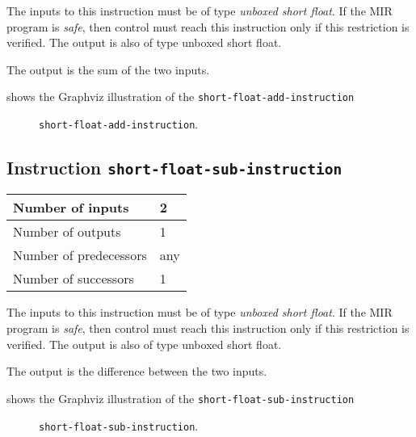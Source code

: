 The inputs to this instruction must be of type \emph{unboxed short
  float}.  If the MIR program is \emph{safe}, then control must reach
this instruction only if this restriction is verified.  The output is
also of type unboxed short float.

The output is the sum of the two inputs.

 shows the Graphviz illustration of the
\texttt{short-float-add-instruction}

\begin{figure}
\begin{center}
\end{center}
\caption{\label{fig-short-float-add-instruction}
\texttt{short-float-add-instruction}.}
\end{figure}

\subsection{Instruction \texttt{short-float-sub-instruction}}
\label{mir-instruction-short-float-sub}

\begin{tabular}{|l|l|}
\hline
Number of inputs & 2\\
\hline
Number of outputs & 1\\
\hline
Number of predecessors & any\\
\hline
Number of successors & 1\\
\hline
\end{tabular}

The inputs to this instruction must be of type \emph{unboxed short
  float}.  If the MIR program is \emph{safe}, then control must reach
this instruction only if this restriction is verified.  The output is
also of type unboxed short float.

The output is the difference between the two inputs.

 shows the Graphviz illustration of the
\texttt{short-float-sub-instruction}

\begin{figure}
\begin{center}
\end{center}
\caption{\label{fig-short-float-sub-instruction}
\texttt{short-float-sub-instruction}.}
\end{figure}

